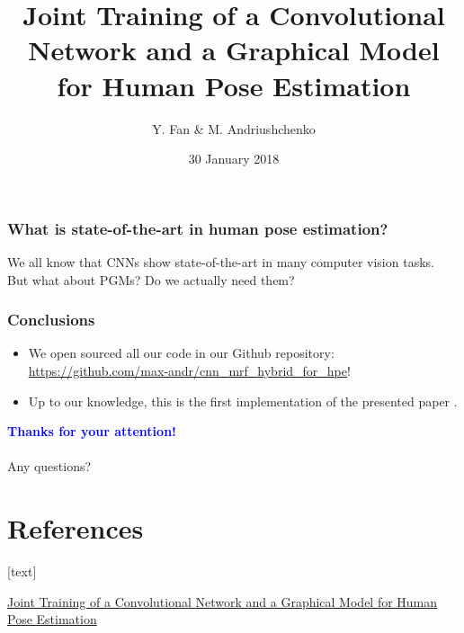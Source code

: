 \documentclass{beamer}
\title[Joint Training of CNN and PGM for HPE]{\textbf{Joint Training of a Convolutional Network and a Graphical Model for Human Pose Estimation}}
\subtitle{}
\author{Y. Fan \& M. Andriushchenko}
\institute{Saarland Univ.}
\date{30 January 2018}
\newcommand\blue[1]{\textcolor{blue}{\textbf{#1}}}
\begin{document}
	
	\begin{frame}
		\titlepage
	\end{frame}

    \begin{frame}[t]
        \frametitle{What is state-of-the-art in \textbf{human pose estimation}?}
        \begin{center}
            We all know that CNNs show state-of-the-art in many computer vision tasks. \\
            But what about PGMs? Do we actually need them?
        \end{center}
    \end{frame}




    \begin{frame}[t]
        \frametitle{Conclusions}
        \begin{itemize}
            \item We open sourced all our code in our Github repository: \url{https://github.com/max-andr/cnn_mrf_hybrid_for_hpe}! \\
            \item Up to our knowledge, this is the first implementation of the presented paper \cite{cnn_pgm_for_hpe}.
        \end{itemize}
    \end{frame}


	\begin{frame}[plain,c]
		\begin{center}
			\Huge \blue{Thanks for your attention!} \\ \ \\
			Any questions? \\
		\end{center}
	\end{frame}
	
	
	\section*{References}
	\begin{thebibliography}{}
		
		\href{https://arxiv.org/abs/1406.2984}
		{Joint Training of a Convolutional Network and a Graphical Model for Human Pose Estimation}
	\end{thebibliography} 
\end{document}
